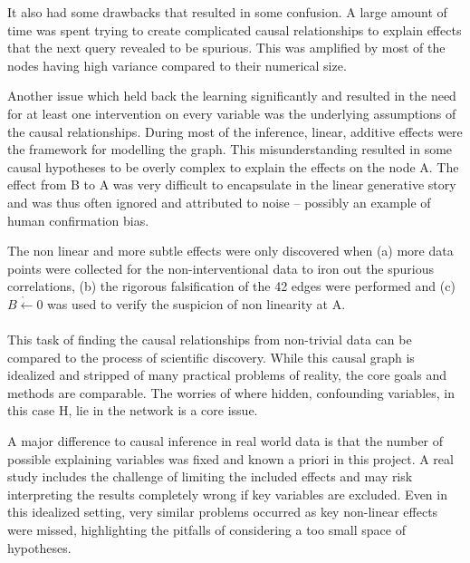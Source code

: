 \documentclass[12pt,fleqn,]{article}
\begin{document}
\begin{multicols}{2}
It also had some drawbacks that resulted in some confusion. A large amount of time was spent trying to create complicated causal relationships to explain effects that the next query revealed to be spurious. This was amplified by most of the nodes having high variance compared to their numerical size.

Another issue which held back the learning significantly and resulted in the need for at least one intervention on every variable was the underlying assumptions of the causal relationships. During most of the inference, linear, additive effects were the framework for modelling the graph. This misunderstanding resulted in some causal hypotheses to be overly complex to explain the effects on the node A. The effect from B to A was very difficult to encapsulate in the linear generative story and was thus often ignored and attributed to noise -- possibly an example of human confirmation bias. 

The non linear and more subtle effects were only discovered when (a) more data points were collected for the non-interventional data to iron out the spurious correlations, (b) the rigorous falsification of the 42 edges were performed and (c) \(\mathring{B\leftarrow0}\) was used to verify the suspicion of non linearity at A.
\\
\\
This task of finding the causal relationships from non-trivial data can be compared to the process of scientific discovery. While this causal graph is idealized and stripped of many practical problems of reality, the core goals and methods are comparable. The worries of where hidden, confounding variables, in this case H, lie in the network is a core issue.

A major difference to causal inference in real world data is that the number of possible explaining variables was fixed and known a priori in this project. A real study includes the challenge of limiting the included effects and may risk interpreting the results completely wrong if key variables are excluded. Even in this idealized setting, very similar problems occurred as key non-linear effects were missed, highlighting the pitfalls of considering a too small space of hypotheses. %


\end{multicols}
\end{document}
